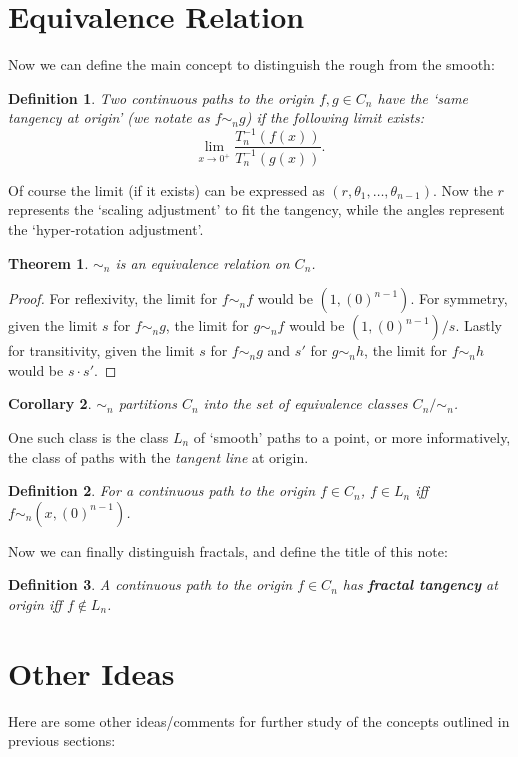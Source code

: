 \documentclass{article}
\theoremstyle{plain}
\newtheorem{definition}{Definition}[section]
\newtheorem{theorem}{Theorem}[section]
\newtheorem{corollary}[theorem]{Corollary}
\begin{document}
\section{Equivalence Relation}
Now we can define the main concept to distinguish the rough from the smooth:
\begin{definition}\label{equiv}
Two continuous paths to the origin $f, g \in C_n$ have the `same tangency at origin' (we notate as $f \sim_n g$) if the following limit exists: $$\lim_{x\rightarrow 0^{+}} \frac{T_n^{-1}(f(x))}{T_n^{-1}(g(x))}.$$
\end{definition}
Of course the limit (if it exists) can be expressed as $(r, \theta_1, \ldots, \theta_{n-1})$. Now the $r$ represents the `scaling adjustment' to fit the tangency, while the angles represent the `hyper-rotation adjustment'.
\begin{theorem}
$\sim_n$ is an equivalence relation on $C_n$.
\end{theorem}
\begin{proof}
For reflexivity, the limit for $f \sim_n f$ would be $(1, (0)^{n-1})$. For symmetry, given the limit $s$ for $f \sim_n g$, the limit for $g \sim_n f$ would be $(1, (0)^{n-1})/s$. Lastly for transitivity, given the limit $s$ for $f \sim_n g$ and $s'$ for $g \sim_n h$, the limit for $f \sim_n h$ would be $s \cdot s'$.
\end{proof}
\begin{corollary}
$\sim_n$ partitions $C_n$ into the set of equivalence classes $C_n / \sim_n$.
\end{corollary}
One such class is the class $L_n$ of `smooth' paths to a point, or more informatively, the class of paths with the \textit{tangent line} at origin.
\begin{definition}
For a continuous path to the origin $f \in C_n$, $f \in L_n$ iff $f \sim_n (x, (0)^{n-1})$.
\end{definition}
Now we can finally distinguish fractals, and define the title of this note:
\begin{definition}
A continuous path to the origin $f \in C_n$  has \textbf{fractal tangency} at origin iff $f \not\in L_n$.
\end{definition}

\section{Other Ideas}
Here are some other ideas/comments for further study of the concepts outlined in previous sections:
\end{document}

